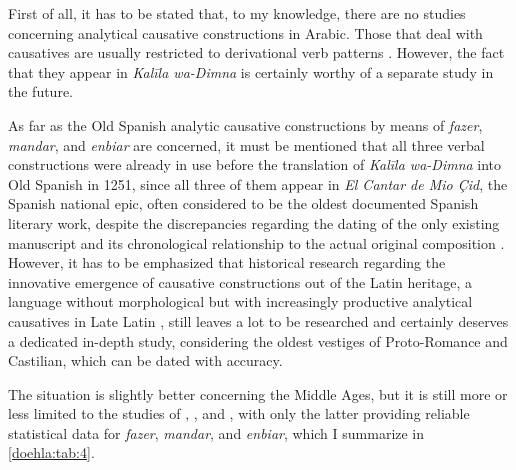 \documentclass[output=paper]{langscibook}
\begin{document}
First of all, it has to be stated that, to my knowledge, there are no studies concerning analytical causative constructions in Arabic. Those that deal with causatives are usually restricted to derivational verb patterns \citep{saad_causatives_1974,ford_three_2009}. However, the fact that they appear in \textit{Kalīla wa-Dimna} is certainly worthy of a separate study in the future. 

As far as the Old Spanish analytic causative constructions by means of \textit{fazer}, \textit{mandar}, and \textit{enbiar} are concerned, it must be mentioned that all three verbal constructions were already in use before the translation of \textit{Kalīla wa-Dimna} into Old Spanish in 1251, since all three of them appear in \textit{El Cantar de Mio Çid}, the Spanish national epic, often considered to be the oldest documented Spanish literary work, despite the discrepancies regarding the dating of the only existing manuscript and its chronological relationship to the actual original composition \citep[276–290]{montaner_frutos_cantar_2011}. However, it has to be emphasized that historical research regarding the innovative emergence of causative constructions out of the Latin heritage, a language without morphological \citep{lehmann_latin_2016} but with increasingly productive analytical causatives in Late Latin \citep[109]{hoffmann_lateinische_2018}, still leaves a lot to be researched and certainly deserves a dedicated in-depth study, considering the oldest vestiges of Proto-Romance and Castilian, which can be dated with accuracy. 

The situation is slightly better concerning the Middle Ages, but it is still more or less limited to the studies of \citet{alfonso_vega_verbos_2006}, \citet{davies_evolution_1995,davies_syntactic_2000}, and \citet{sanaphre_villanueva_analytic_2010}, with only the latter providing reliable statistical data for \textit{fazer}, \textit{mandar}, and \textit{enbiar}, which I summarize in \autoref{doehla:tab:4}.
\end{document}
